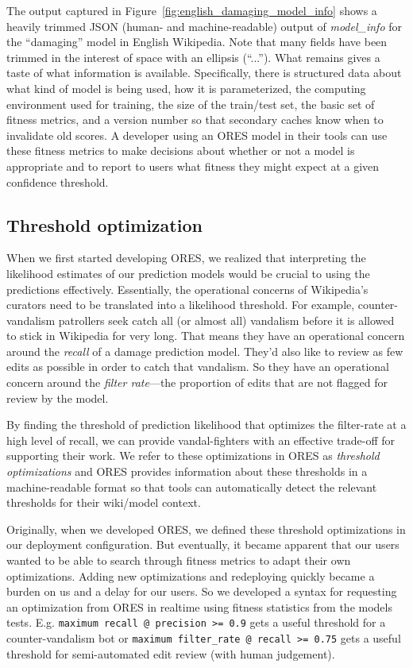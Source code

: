 The output captured in Figure~\ref{fig:english_damaging_model_info} shows a heavily trimmed JSON (human- and machine-readable) output of \emph{model\_info} for the ``damaging'' model in English Wikipedia.  Note that many fields have been trimmed in the interest of space with an ellipsis (``...'').  What remains gives a taste of what information is available.  Specifically, there is structured data about what kind of model is being used, how it is parameterized, the computing environment used for training, the size of the train/test set, the basic set of fitness metrics, and a version number so that secondary caches know when to invalidate old scores.  A developer using an ORES model in their tools can use these fitness metrics to make decisions about whether or not a model is appropriate and to report to users what fitness they might expect at a given confidence threshold.

\subsection{Threshold optimization}
When we first started developing ORES, we realized that interpreting the likelihood estimates of our prediction models would be crucial to using the predictions effectively.  Essentially, the operational concerns of Wikipedia's curators need to be translated into a likelihood threshold.  For example, counter-vandalism patrollers seek catch all (or almost all) vandalism before it is allowed to stick in Wikipedia for very long.  That means they have an operational concern around the \emph{recall} of a damage prediction model.  They'd also like to review as few edits as possible in order to catch that vandalism.  So they have an operational concern around the \emph{filter rate}---the proportion of edits that are not flagged for review by the model\cite{halfaker2016notes}.

By finding the threshold of prediction likelihood that optimizes the filter-rate at a high level of recall, we can provide vandal-fighters with an effective trade-off for supporting their work.  We refer to these optimizations in ORES as \emph{threshold optimizations} and ORES provides information about these thresholds in a machine-readable format so that tools can automatically detect the relevant thresholds for their wiki/model context.

Originally, when we developed ORES, we defined these threshold optimizations in our deployment configuration.  But eventually, it became apparent that our users wanted to be able to search through fitness metrics to adapt their own optimizations.  Adding new optimizations and redeploying quickly became a burden on us and a delay for our users.  So we developed a syntax for requesting an optimization from ORES in realtime using fitness statistics from the models tests. E.g. \texttt{maximum recall @ precision >= 0.9} gets a useful threshold for a counter-vandalism bot or \texttt{maximum filter\_rate @ recall >= 0.75} gets a useful threshold for semi-automated edit review (with human judgement).

